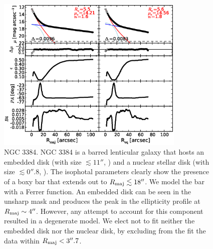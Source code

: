 \documentclass[preprint2]{emulateapj}
\newcommand{\fitfigurewidth}{0.8\textwidth}
\begin{document}
  \begin{figure}[h]
  \begin{center}
  \includegraphics[width=\fitfigurewidth]{images/n3384_1Dfit.eps}
  \caption{NGC 3384.
  NGC 3384 is a barred lenticular galaxy that hosts 
  an embedded disk (with size $\lesssim 11''$, \citealt{erwin2004}) and 
  a nuclear stellar disk (with size $\lesssim 0''.8$, \citealt{ledo2010}).
  The isophotal parameters clearly show the presence of a boxy bar that extends out to $R_{\rm maj} \lesssim 18''$.
  We model the bar with a Ferrer function.
  An embedded disk can be seen in the unsharp mask and produces the peak in the ellipticity profile at $R_{\rm maj} \sim 4''$.
  However, any attempt to account for this component resulted in a degenerate model.
  We elect not to fit neither the embedded disk nor the nuclear disk, by excluding from the fit the data within $R_{\rm maj} < 3''.7$. 
  }
  \end{center}
  \end{figure}
\end{document}

